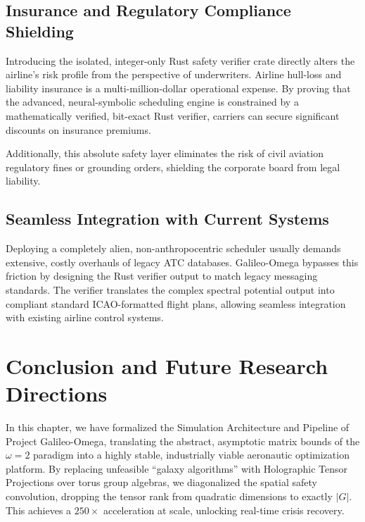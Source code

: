 \documentclass[11pt,a4paper]{book}
\begin{document}
\subsection{Insurance and Regulatory Compliance Shielding}\label{subsec:insurance_shield}

Introducing the isolated, integer-only Rust safety verifier crate directly alters the airline's risk profile from the perspective of underwriters. Airline hull-loss and liability insurance is a multi-million-dollar operational expense. By proving that the advanced, neural-symbolic scheduling engine is constrained by a mathematically verified, bit-exact Rust verifier, carriers can secure significant discounts on insurance premiums.

Additionally, this absolute safety layer eliminates the risk of civil aviation regulatory fines or grounding orders, shielding the corporate board from legal liability.

\subsection{Seamless Integration with Current Systems}\label{subsec:integration}

Deploying a completely alien, non-anthropocentric scheduler usually demands extensive, costly overhauls of legacy ATC databases. Galileo-Omega bypasses this friction by designing the Rust verifier output to match legacy messaging standards. The verifier translates the complex spectral potential output into compliant standard ICAO-formatted flight plans, allowing seamless integration with existing airline control systems.

\section{Conclusion and Future Research Directions}\label{sec:conclusion}

In this chapter, we have formalized the Simulation Architecture and Pipeline of Project Galileo-Omega, translating the abstract, asymptotic matrix bounds of the $\omega = 2$ paradigm into a highly stable, industrially viable aeronautic optimization platform. By replacing unfeasible ``galaxy algorithms'' with Holographic Tensor Projections over torus group algebras, we diagonalized the spatial safety convolution, dropping the tensor rank from quadratic dimensions to exactly $\lvert G \rvert$. This achieves a $250\times$ acceleration at scale, unlocking real-time crisis recovery.
\end{document}
